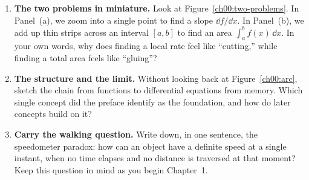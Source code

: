 \begin{enumerate}
  \item \textbf{The two problems in miniature.} Look at Figure~\ref{ch00:two-problems}. In Panel~(a),
  we zoom into a single point to find a slope $\dd f / \dd x$. In Panel~(b), we add up thin strips
  across an interval $[a,b]$ to find an area $\int_a^b f(x)\,\dd x$. In your own words, why does finding
  a local rate feel like ``cutting,'' while finding a total area feels like ``gluing''?

  \item \textbf{The structure and the limit.} Without looking back at Figure~\ref{ch00:arc}, sketch the
  chain from functions to differential equations from memory. Which single concept did the preface identify as
  the foundation, and how do later concepts build on it?

  \item \textbf{Carry the walking question.} Write down, in one sentence, the speedometer paradox:
  how can an object have a definite speed at a single instant, when no time elapses and no distance
  is traversed at that moment? Keep this question in mind as you begin Chapter~1.
\end{enumerate}
